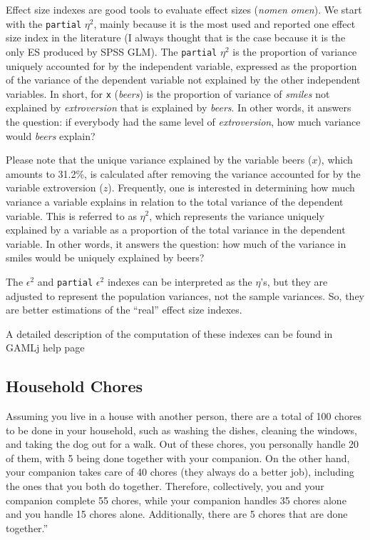 \documentclass[
]{book}
\begin{document}
Effect size indexes are good tools to evaluate effect sizes (\emph{nomen omen}). We start with the \texttt{partial} \(\eta^2\), mainly because it is the most used and reported one effect size index in the literature (I always thought that is the case because it is the only ES produced by SPSS GLM). The \texttt{partial} \(\eta^2\) is the proportion of variance uniquely accounted for by the independent variable, expressed as the proportion of the variance of the dependent variable not explained by the other independent variables. In short, for \texttt{x} (\emph{beers}) is the proportion of variance of \emph{smiles} not explained by \emph{extroversion} that is explained by \emph{beers}. In other words, it answers the question: if everybody had the same level of \emph{extroversion}, how much variance would \emph{beers} explain?

Please note that the unique variance explained by the variable beers (\(x\)), which amounts to 31.2\%, is calculated after removing the variance accounted for by the variable extroversion (\(z\)). Frequently, one is interested in determining how much variance a variable explains in relation to the total variance of the dependent variable. This is referred to as \(\eta^2\), which represents the variance uniquely explained by a variable as a proportion of the total variance in the dependent variable. In other words, it answers the question: how much of the variance in smiles would be uniquely explained by beers?

The \(\epsilon^2\) and \texttt{partial} \(\epsilon^2\) indexes can be interpreted as the \(\eta\)'s, but they are adjusted to represent the population variances, not the sample variances. So, they are better estimations of the ``real'' effect size indexes.

A detailed description of the computation of these indexes can be found in GAMLj help page

\hypertarget{household-chores}{%
\subsection{Household Chores}\label{household-chores}}

Assuming you live in a house with another person, there are a total of 100 chores to be done in your household, such as washing the dishes, cleaning the windows, and taking the dog out for a walk. Out of these chores, you personally handle 20 of them, with 5 being done together with your companion. On the other hand, your companion takes care of 40 chores (they always do a better job), including the ones that you both do together. Therefore, collectively, you and your companion complete 55 chores, while your companion handles 35 chores alone and you handle 15 chores alone. Additionally, there are 5 chores that are done together.''
\end{document}
